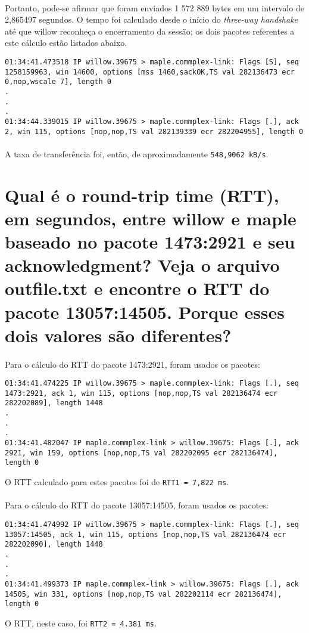 \documentclass[a4paper,10pt,oneside,final,titlepage,onecolumn]{article}
\begin{document}
\paragraph{}Portanto, pode-se afirmar que foram enviados 1 572 889 bytes em um intervalo de 2,865497 segundos. O tempo foi calculado desde o início do \emph{three-way handshake} até que willow reconheça o encerramento da sessão; os dois pacotes referentes a este cálculo estão listados abaixo.
\begin{lstlisting}
01:34:41.473518 IP willow.39675 > maple.commplex-link: Flags [S], seq 1258159963, win 14600, options [mss 1460,sackOK,TS val 282136473 ecr 0,nop,wscale 7], length 0
.
.
.
01:34:44.339015 IP willow.39675 > maple.commplex-link: Flags [.], ack 2, win 115, options [nop,nop,TS val 282139339 ecr 282204955], length 0
\end{lstlisting}
\paragraph{}A taxa de transferência foi, então, de aproximadamente \verb|548,9062 kB/s|.



\section{Qual é o round-trip time (RTT), em segundos, entre willow e maple baseado no pacote 1473:2921 e seu acknowledgment? Veja o arquivo outfile.txt e encontre o RTT do pacote 13057:14505. Porque esses dois valores são diferentes?}
\paragraph{}Para o cálculo do RTT do pacote 1473:2921, foram usados os pacotes:
\begin{lstlisting}
01:34:41.474225 IP willow.39675 > maple.commplex-link: Flags [.], seq 1473:2921, ack 1, win 115, options [nop,nop,TS val 282136474 ecr 282202089], length 1448
.
.
.
01:34:41.482047 IP maple.commplex-link > willow.39675: Flags [.], ack 2921, win 159, options [nop,nop,TS val 282202095 ecr 282136474], length 0
\end{lstlisting}
O RTT calculado para estes pacotes foi de \verb|RTT1 = 7,822 ms|.
\paragraph{}Para o cálculo do RTT do pacote 13057:14505, foram usados os pacotes:
\begin{lstlisting}
01:34:41.474992 IP willow.39675 > maple.commplex-link: Flags [.], seq 13057:14505, ack 1, win 115, options [nop,nop,TS val 282136474 ecr 282202090], length 1448
.
.
.
01:34:41.499373 IP maple.commplex-link > willow.39675: Flags [.], ack 14505, win 331, options [nop,nop,TS val 282202114 ecr 282136474], length 0
\end{lstlisting}
O RTT, neste caso, foi \verb|RTT2 = 4.381 ms|.
\end{document}
